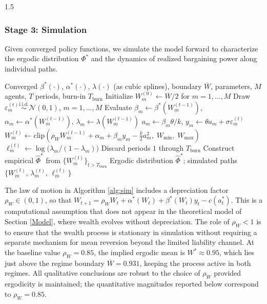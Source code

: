 \documentclass[12pt]{article}
\theoremstyle{definition}
\theoremstyle{plain}
\begin{document}
\begin{spacing}{1.5}
\subsubsection*{Stage 3: Simulation}
 
Given converged policy functions, we simulate the model forward to characterize the ergodic distribution $\Phi^{*}$ and the dynamics of realized bargaining power along individual paths.
 
\begin{algorithm}[H]
\caption{Simulation of ergodic distribution and bargaining power dynamics}
\label{alg:sim}
\begin{algorithmic}[1]
\Require Converged $\beta^{*}(\cdot)$, $\alpha^{*}(\cdot)$, $\lambda(\cdot)$
         (as cubic splines), boundary $\overline{W}$, parameters,
         $M$ agents, $T$ periods, burn-in $T_{\mathrm{burn}}$
\State Initialize $W_{m}^{(0)} \leftarrow \overline{W}/2$
       for $m = 1, \ldots, M$
    \State Draw $\varepsilon_{m}^{(t)}
           \stackrel{\mathrm{i.i.d.}}{\sim} \mathcal{N}(0,1)$,
           $m = 1, \ldots, M$
        \State Evaluate $\beta_{m} \leftarrow \beta^{*}(W_{m}^{(t-1)})$,
               $\alpha_{m} \leftarrow \alpha^{*}(W_{m}^{(t-1)})$,
               $\lambda_{m} \leftarrow \lambda(W_{m}^{(t-1)})$
        \State $a_{m} \leftarrow \beta_{m}\theta/k$,\quad
               $y_{m} \leftarrow \theta a_{m}
               + \sigma\varepsilon_{m}^{(t)}$
        \State $W_{m}^{(t)}
               \leftarrow \mathrm{clip}\!\left(
               \rho_{W} W_{m}^{(t-1)} + \alpha_{m} + \beta_{m}y_{m}
               - \tfrac{k}{2}a_{m}^{2},\;
               W_{\min},\; W_{\max}\right)$
        \State $\ell_{m}^{(t)}
               \leftarrow \log\bigl(\lambda_{m}/(1-\lambda_{m})\bigr)$
    \EndFor
\EndFor
\State Discard periods $1$ through $T_{\mathrm{burn}}$
\State Construct empirical $\hat{\Phi}^{*}$
       from $\{W_{m}^{(t)}\}_{t > T_{\mathrm{burn}}}$
\Ensure Ergodic distribution $\hat{\Phi}^{*}$;
        simulated paths $\{W_{m}^{(t)},\,\lambda_{m}^{(t)},\,
        \ell_{m}^{(t)}\}$
\end{algorithmic}
\end{algorithm}
 
The law of motion in Algorithm \ref{alg:sim} includes a depreciation factor $\rho_W \in (0,1)$, so that $W_{t+1} = \rho_W W_t + \alpha^*(W_t) + \beta^*(W_t) y_t - c(a_t^*)$. This is a computational assumption that does not appear in the theoretical model of Section \ref{Model}, where wealth evolves without depreciation. The role of $\rho_W < 1$ is to ensure that the wealth process is stationary in simulation without requiring a separate mechanism for mean reversion beyond the limited liability channel. At the baseline value $\rho_W = 0.85$, the implied ergodic mean is $W^* \approx 0.95$, which lies just above the regime boundary $\overline{W} = 0.931$, keeping the process active in both regimes. All qualitative conclusions are robust to the choice of $\rho_W$ provided ergodicity is maintained; the quantitative magnitudes reported below correspond to $\rho_W = 0.85$.
 

\end{spacing}
\end{document}
